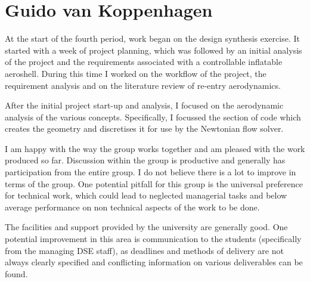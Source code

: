 
\section{Guido van Koppenhagen}
At the start of the fourth period, work began on the design synthesis exercise.  It started with a week of project planning, which was followed by an initial analysis of the project and the requirements associated with a controllable inflatable aeroshell.  During this time I worked on the workflow of the project, the requirement analysis and on the literature review of re-entry aerodynamics.  

After the initial project start-up and analysis, I focused on the aerodynamic analysis of the various concepts. Specifically, I focussed the section of code which creates the geometry and discretises it for use by the Newtonian flow solver. 

I am happy with the way the group works together and am pleased with the work produced so far. Discussion within the group is productive and generally has participation from the entire group.  I do not believe there is a lot to improve in terms of the group. One potential pitfall for this group is the universal preference for technical work, which could lead to neglected managerial tasks and below average performance on non technical aspects of the work to be done. 

The facilities and support provided by the university are generally good. One potential improvement in this area is communication to the students (specifically from the managing DSE staff), as deadlines and methods of delivery are not always clearly specified and conflicting information on various deliverables can be found.  

   
